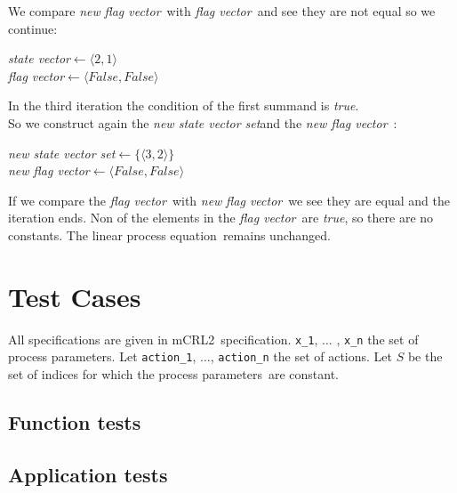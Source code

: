 \documentclass[a4paper,10pt]{article}
\theoremstyle{plain}
\theoremstyle{definition}
\newcommand{\lpe}{linear process equation}
\newcommand{\mcrl}{mCRL2}
\newcommand{\pps}{process parameters}
\newcommand{\ti}{\textit}
\newcommand{\sv}{\textit{state vector}}
\newcommand{\fv}{\textit{flag vector}}
\newcommand{\svs}{\textit{new state vector set}}
\newcommand{\nfv}{\textit{new flag vector}}
\newcommand{\la}{$\leftarrow$}
\begin{document}
We compare \ti{new} \fv\ with \fv\ and see they are not equal so we continue:
\begin{center}\begin{minipage}{250pt}
\sv \la $\langle 2 , 1 \rangle $\\
\fv \la $\langle False , False \rangle $\\
\end{minipage}\end{center}

In the third iteration the condition of the first summand is \ti{true}.\\
So we construct again the \svs and the \nfv\ : 
\begin{center}\begin{minipage}{250pt}
\svs \la  $\lbrace \langle 3 , 2 \rangle \rbrace $\\
\nfv \la  $\langle False , False \rangle $ \\
\end{minipage}\end{center}

If we compare the \fv\ with \ti{new} \fv\ we see they are equal and the iteration ends.
Non of the elements in the \fv\ are \ti{true}, so there are no constants. The \lpe\ remains unchanged.

\section{Test Cases}
All specifications are given in \mcrl\ specification.
\verb"x_1", $\ldots$ , \verb"x_n" the set of process parameters.
Let \verb"action_1", $\ldots$, \verb "action_n" the set of actions.
Let $S$ be the set of indices for which the \pps\ are constant. 

\subsection{Function tests}

\subsection{Application tests}
\end{document}
